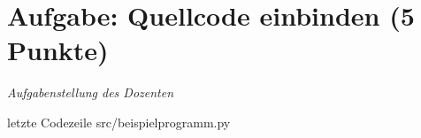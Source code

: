 
\newcommand{\dozent}{Claudia Müller-Birn und Barry Linnert}					%
\newcommand{\tutor}{Florian Alex}						%
\newcommand{\tutoriumNo}{Übung 05}				%
\newcommand{\ubungNo}{1}									%
\newcommand{\veranstaltung}{Nichtsequentielle und verteilte Programmierung}	%
\newcommand{\semester}{SoSe 2020}						%
\newcommand{\studenten}{Qianli Wang und Nazar Sopiha}			%




\section{Aufgabe: Quellcode einbinden \hfill (5 Punkte)}
{\itshape Aufgabenstellung des Dozenten}

 letzte Codezeile
{src/beispielprogramm.py}

